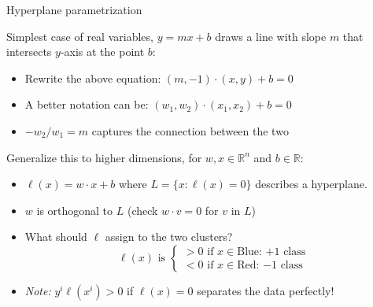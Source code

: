 \documentclass{beamer}
\begin{document}
\begin{frame}{Hyperplane parametrization}

Simplest case of real variables, $y = mx + b$ draws a line with slope $m$ that intersects $y$-axis at the point $b$:

\begin{itemize}
    \item Rewrite the above equation: $(m, -1) \cdot (x, y) + b = 0$
    \item A better notation can be: $(w_1, w_2) \cdot (x_1, x_2) + b = 0$ \item $-w_2/w_1 = m$ captures the connection between the two
\end{itemize}
\pause
Generalize this to higher dimensions, for $w, x \in \mathbb{R}^n$ and $b \in \mathbb{R}$:
\begin{itemize}
    \item $ \ell(x) = w\cdot x + b$ where $L=\{x:\ell(x) = 0\}$ describes a hyperplane.
    \item $w$ is orthogonal to $L$ (check $w\cdot v = 0$ for $v$ in $L$)
    \item What should $\ell$ assign to the two clusters?
        \[
        \ell(x) \text{ is } 
        \begin{cases}
        > 0 \text{ if } x \in \text{Blue: $+1$ class} \\
        < 0 \text{ if } x \in \text{Red: $-1$ class}
        \end{cases}
        \]
    \item \textit{Note:} $y^i\ell(x^i) > 0$ if $\ell(x)=0$ separates the data perfectly! 
\end{itemize}
    
\end{frame}

\end{document}
